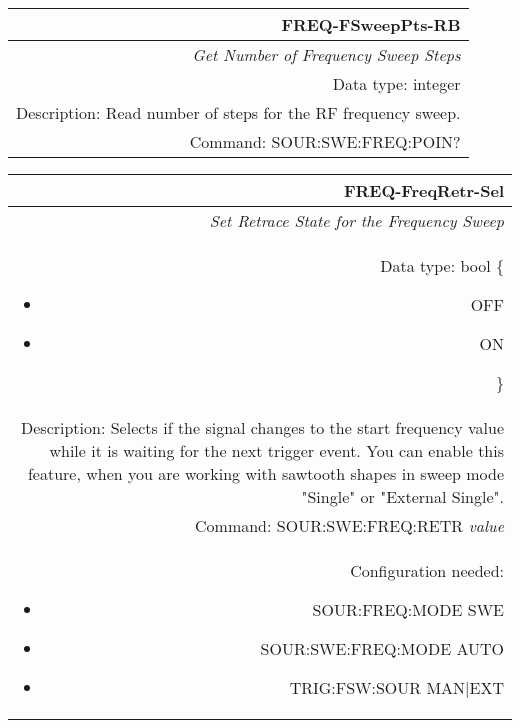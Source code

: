 \documentclass[openany]{article}
\begin{document}
		\begin{tabular}{N}
			\hline
			\bfseries FREQ-FSweepPts-RB \\ \hline
			\emph{Get Number of Frequency Sweep Steps} \\
			Data type: integer \\
			Description: Read number of steps for the RF frequency sweep. \\
			Command: SOUR:SWE:FREQ:POIN? \\

		\end{tabular}
%
		\begin{tabular}{N}
			\hline
			\bfseries FREQ-FreqRetr-Sel \\ \hline
			\emph{Set Retrace State for the Frequency Sweep} \\
			Data type: bool \{\begin{itemize}[noitemsep]
				\small
				\item[] OFF
				\item[] ON
			\end{itemize}\} \\
			Description: Selects if the signal changes to the start frequency value while it is waiting for the next trigger event. You can enable this feature, when you are working with sawtooth shapes in sweep mode "Single" or "External Single". \\
			Command: SOUR:SWE:FREQ:RETR \emph{value} \\
			Configuration needed: \begin{itemize}[noitemsep]
				\small
				\item[] SOUR:FREQ:MODE SWE
				\item[] SOUR:SWE:FREQ:MODE AUTO
				\item[] TRIG:FSW:SOUR MAN|EXT
			\end{itemize} \\

		\end{tabular}
\end{document}
